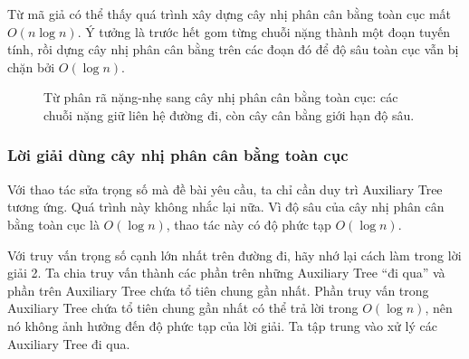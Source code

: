 \documentclass[11pt]{article}
\begin{document}
Từ mã giả có thể thấy quá trình xây dựng cây nhị phân cân bằng toàn cục mất
$O(n\log n)$. Ý tưởng là trước hết gom từng chuỗi nặng thành một đoạn tuyến
tính, rồi dựng cây nhị phân cân bằng trên các đoạn đó để độ sâu toàn cục vẫn
bị chặn bởi \(O(\log n)\).

\begin{figure}[ht]
\centering
{}
\caption{Từ phân rã nặng-nhẹ sang cây nhị phân cân bằng toàn cục: các chuỗi nặng giữ liên hệ đường đi, còn cây cân bằng giới hạn độ sâu.}
\end{figure}

\subsubsection{Lời giải dùng cây nhị phân cân bằng toàn cục}

Với thao tác sửa trọng số mà đề bài yêu cầu, ta chỉ cần duy trì Auxiliary Tree
tương ứng. Quá trình này không nhắc lại nữa. Vì độ sâu của cây nhị phân cân
bằng toàn cục là $O(\log n)$, thao tác này có độ phức tạp $O(\log n)$.

Với truy vấn trọng số cạnh lớn nhất trên đường đi, hãy nhớ lại cách làm trong
lời giải 2. Ta chia truy vấn thành các phần trên những Auxiliary Tree ``đi qua''
và phần trên Auxiliary Tree chứa tổ tiên chung gần nhất. Phần truy vấn trong
Auxiliary Tree chứa tổ tiên chung gần nhất có thể trả lời trong $O(\log n)$,
nên nó không ảnh hưởng đến độ phức tạp của lời giải. Ta tập trung vào xử lý
các Auxiliary Tree đi qua.
\end{document}
